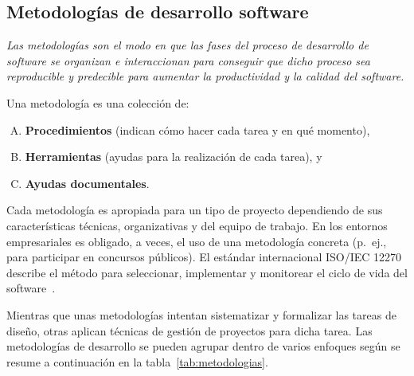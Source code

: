 \subsection{Metodologías de desarrollo software}
\emph{Las metodologías son el modo en que las fases del proceso de desarrollo de software se organizan e interaccionan para conseguir que dicho proceso sea reproducible y predecible para aumentar la productividad y la calidad del software.}

\noindent Una metodología es una colección de:

\begin{enumerate}[A.]
\item \textbf{Procedimientos} (indican cómo hacer cada tarea y en qué momento),
\item \textbf{Herramientas} (ayudas para la realización de cada tarea), y
\item \textbf{Ayudas documentales}.
\end{enumerate}

Cada metodología es apropiada para un tipo de proyecto dependiendo de sus características técnicas, organizativas y del equipo de trabajo. En los entornos empresariales es obligado, a veces, el uso de una metodología concreta (p.~ej., para participar en concursos públicos). El estándar internacional ISO/IEC 12270 describe el método para seleccionar, implementar y monitorear el ciclo de vida del software~\cite{Vijayasarathy16,Appelbaum22}.

Mientras que unas metodologías intentan sistematizar y formalizar las tareas de diseño, otras aplican técnicas de gestión de proyectos para dicha tarea. Las metodologías de desarrollo se pueden agrupar dentro de varios enfoques según se resume a continuación en la tabla~\ref{tab:metodologias}.

